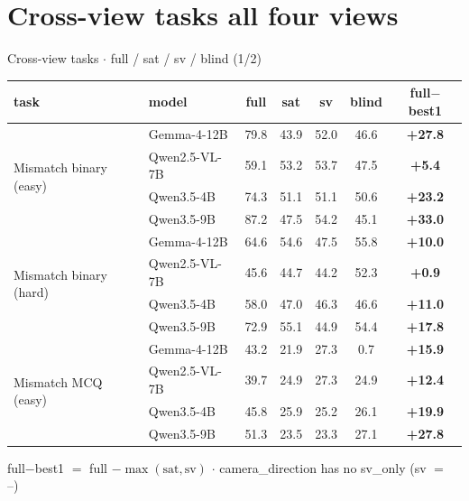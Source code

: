 \documentclass[aspectratio=169]{beamer}
\begin{document}
\section{Cross-view tasks \textemdash{} all four views}
\begin{frame}{Cross-view tasks \textbf{$\cdot$} full / sat / sv / blind (1/2)}
\centering\scriptsize
\begin{tabular}{llcccc>{\bfseries}c}
\toprule
task & model & full & sat & sv & blind & full$-$best1 \\
\midrule
\multirow{4}{*}{Mismatch binary (easy)} & Gemma-4-12B & 79.8 & 43.9 & 52.0 & 46.6 & \textcolor{good}{+27.8} \\
 & Qwen2.5-VL-7B & 59.1 & 53.2 & 53.7 & 47.5 & \textcolor{good}{+5.4} \\
 & Qwen3.5-4B & 74.3 & 51.1 & 51.1 & 50.6 & \textcolor{good}{+23.2} \\
 & Qwen3.5-9B & 87.2 & 47.5 & 54.2 & 45.1 & \textcolor{good}{+33.0} \\
\midrule
\multirow{4}{*}{Mismatch binary (hard)} & Gemma-4-12B & 64.6 & 54.6 & 47.5 & 55.8 & \textcolor{good}{+10.0} \\
 & Qwen2.5-VL-7B & 45.6 & 44.7 & 44.2 & 52.3 & +0.9 \\
 & Qwen3.5-4B & 58.0 & 47.0 & 46.3 & 46.6 & \textcolor{good}{+11.0} \\
 & Qwen3.5-9B & 72.9 & 55.1 & 44.9 & 54.4 & \textcolor{good}{+17.8} \\
\midrule
\multirow{4}{*}{Mismatch MCQ (easy)} & Gemma-4-12B & 43.2 & 21.9 & 27.3 & 0.7 & \textcolor{good}{+15.9} \\
 & Qwen2.5-VL-7B & 39.7 & 24.9 & 27.3 & 24.9 & \textcolor{good}{+12.4} \\
 & Qwen3.5-4B & 45.8 & 25.9 & 25.2 & 26.1 & \textcolor{good}{+19.9} \\
 & Qwen3.5-9B & 51.3 & 23.5 & 23.3 & 27.1 & \textcolor{good}{+27.8} \\
\bottomrule
\end{tabular}
\vspace{2pt}\par\tiny full$-$best1 $=$ full $-\max(\text{sat},\text{sv})$ \textbf{$\cdot$} camera\_direction has no sv\_only (sv $=$ --)
\end{frame}
\end{document}
